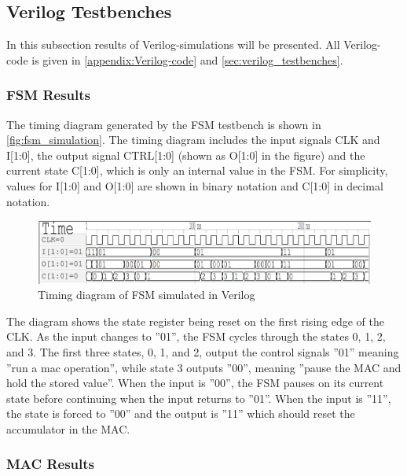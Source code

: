 \subsection{Verilog Testbenches}

In this subsection results of Verilog-simulations will be presented. All Verilog-code is given in \autoref{appendix:Verilog-code} and \ref{sec:verilog_testbenches}.

\subsubsection{FSM Results}
\label{subsubsec:fsm_results}

\noindent
The timing diagram generated by the FSM testbench is shown in \autoref{fig:fsm_simulation}. The timing diagram includes the input signals CLK and I[1:0], the output signal CTRL[1:0] (shown as O[1:0] in the figure) and the current state C[1:0], which is only an internal value in the FSM. For simplicity, values for I[1:0] and O[1:0] are shown in binary notation and C[1:0] in decimal notation.

\begin{figure}[H]
    \centering
    \includegraphics[width=\textwidth]{Figures/FSM_testbench_out.png}
    \caption{Timing diagram of FSM simulated in Verilog}
    \label{fig:fsm_simulation}
\end{figure}

The diagram shows the state register being reset on the first rising edge of the CLK. As the input changes to ''01'', the FSM cycles through the states 0, 1, 2, and 3. The first three states, 0, 1, and 2, output the control signals ''01'' meaning ''run a mac operation'', while state 3 outputs ''00'', meaning ''pause the MAC and hold the stored value''. When the input is ''00'', the FSM pauses on its current state before continuing when the input returns to ''01''. When the input is ''11'', the state is forced to ''00'' and the output is ''11'' which should reset the accumulator in the MAC.

\subsubsection{MAC Results}
\label{subsubsec:mac_results}

